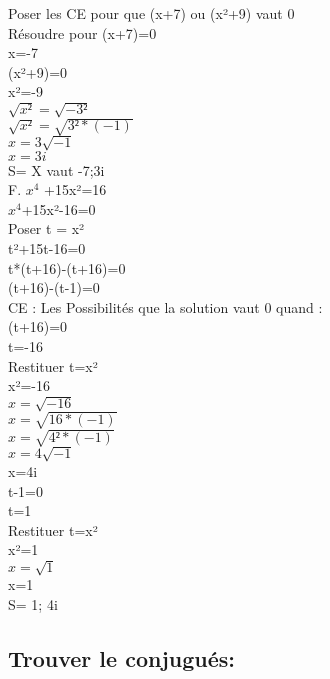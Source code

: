 Poser les CE pour que (x+7) ou (x²+9) vaut 0 \\

Résoudre pour (x+7)=0 \\
x=-7 \\
(x²+9)=0 \\
x²=-9 \\
$\sqrt{x²} =\sqrt{-3²}$ \\
$\sqrt{x²}=\sqrt{3²*(-1)}$ \\
$x=3\sqrt{-1}$ \\
$x=3i$ \\

S= X vaut -7;3i \\


\vspace{10mm} %
F. $x^{4}$ +15x²=16 \\

$x^{4}$+15x²-16=0 \\
Poser t = x² \\
t²+15t-16=0 \\
t*(t+16)-(t+16)=0 \\
(t+16)-(t-1)=0 \\

CE : Les Possibilités que la solution vaut 0 quand : \\

(t+16)=0 \\
t=-16 \\
Restituer t=x² \\
x²=-16 \\
$x=\sqrt{-16}$ \\
$x=\sqrt{16 * (-1)}$ \\
$x=\sqrt{4² * (-1)}$ \\
$x=4\sqrt{-1}$ \\
x=4i \\


t-1=0 \\
t=1 \\
Restituer t=x² \\
x²=1 \\
$x=\sqrt{1}$ \\
x=1 \\

S= 1; 4i \\

\newpage

\vspace{3mm} %
\subsection{Trouver le conjugués:}
\vspace{3mm} %

